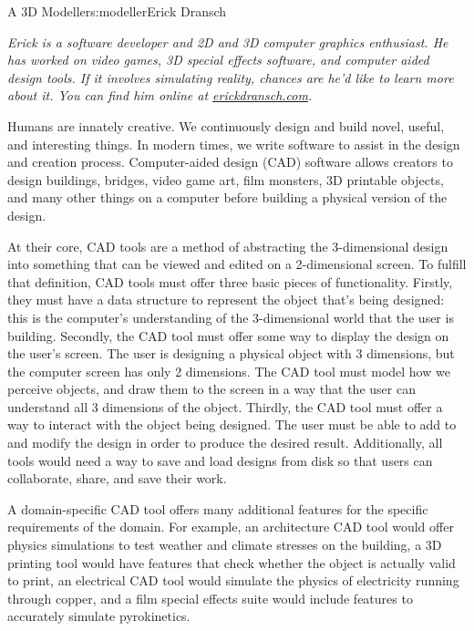 \begin{aosachapter}{A 3D Modeller}{s:modeller}{Erick Dransch}

\emph{Erick is a software developer and 2D and 3D computer graphics
enthusiast. He has worked on video games, 3D special effects software,
and computer aided design tools. If it involves simulating reality,
chances are he'd like to learn more about it. You can find him online at
\href{http://erickdransch.com}{erickdransch.com}.}

\label{introduction}

Humans are innately creative. We continuously design and build novel,
useful, and interesting things. In modern times, we write software to
assist in the design and creation process. Computer-aided design (CAD)
software allows creators to design buildings, bridges, video game art,
film monsters, 3D printable objects, and many other things on a computer
before building a physical version of the design.

At their core, CAD tools are a method of abstracting the 3-dimensional
design into something that can be viewed and edited on a 2-dimensional
screen. To fulfill that definition, CAD tools must offer three basic
pieces of functionality. Firstly, they must have a data structure to
represent the object that's being designed: this is the computer's
understanding of the 3-dimensional world that the user is building.
Secondly, the CAD tool must offer some way to display the design on the
user's screen. The user is designing a physical object with 3
dimensions, but the computer screen has only 2 dimensions. The CAD tool
must model how we perceive objects, and draw them to the screen in a way
that the user can understand all 3 dimensions of the object. Thirdly,
the CAD tool must offer a way to interact with the object being
designed. The user must be able to add to and modify the design in order
to produce the desired result. Additionally, all tools would need a way
to save and load designs from disk so that users can collaborate, share,
and save their work.

A domain-specific CAD tool offers many additional features for the
specific requirements of the domain. For example, an architecture CAD
tool would offer physics simulations to test weather and climate
stresses on the building, a 3D printing tool would have features that
check whether the object is actually valid to print, an electrical CAD
tool would simulate the physics of electricity running through copper,
and a film special effects suite would include features to accurately
simulate pyrokinetics.


\end{aosachapter}

